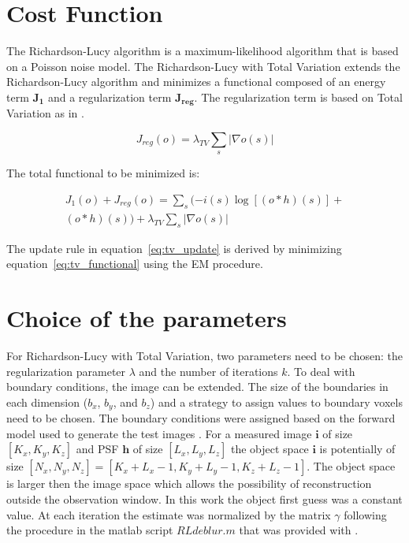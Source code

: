 \documentclass[conference,a4paper]{IEEEtran}
\begin{document}
\section{Cost Function}

The Richardson-Lucy algorithm is a maximum-likelihood algorithm that is based on a Poisson noise model.  The Richardson-Lucy with Total Variation extends the Richardson-Lucy algorithm and minimizes a functional composed of an energy term \(\mathbf{J_{1}}\) and a regularization term \(\mathbf{J_{reg}}\).  The regularization term is based on Total Variation as in \cite{rudin1992}.

\begin{equation} \label{eq:tv}
{J_{reg}(o)} = \lambda_{TV}\sum_{s}|\nabla{o(s)}|
\end{equation}

The total functional to be minimized is:

\begin{multline} \label{eq:tv_functional}
	{J_{1}(o)} + {J_{reg}(o)} = \sum_{s}(-i(s)\log[(o*h)(s)]+\\
(o*h)(s))+\lambda_{TV}\sum_{s}|\nabla{o(s)}|
\end{multline}

The update rule in equation~\ref{eq:tv_update} is derived by minimizing equation~\ref{eq:tv_functional} using the EM procedure. 


\section{Choice of the parameters}

For Richardson-Lucy with Total Variation, two parameters need to be chosen: the regularization parameter $\lambda$ and the number of iterations $k$.  To deal with boundary conditions, the image can be extended.  The size of the boundaries in each dimension ($b_x$, $b_y$, and $b_z$) and a strategy to assign values to boundary voxels need to be chosen.  The boundary conditions were assigned based on the forward model used to generate the test images \cite{vonesch2013}.  For a measured image $\mathbf{i}$ of size $[K_{x}, K_{y}, K_{z}]$ and PSF $\mathbf{h}$ of size $[L_{x}, L_{y}, L_{z}]$ the object space $\mathbf{i}$ is potentially of size $[N_{x}, N_{y}, N_{z}]=[K_{x}+L_{x}-1, K_{y}+L_{y}-1, K_{z}+L_{z}-1]$.  The object space is larger then the image space which allows the possibility of reconstruction outside the observation window.   In this work the object first guess was a constant value.  At each iteration the estimate was normalized by the matrix $\gamma$ following the procedure in the matlab script $RLdeblur.m$ that was provided with \cite{vonesch2013}.
\end{document}
